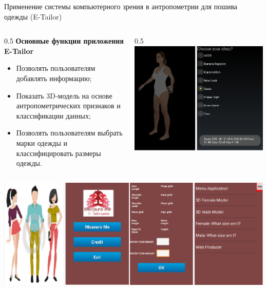 \documentclass[10pt,pdf,hyperref={unicode},xcolor=table]{beamer}
\begin{document}
\begin{frame}{Применение системы компьютерного зрения в антропометрии для пошива одежды (E-Tailor)}
\begin{columns}
		\begin{column} {0.5\textwidth}			
\textbf{Основные функции приложения E-Tailor}
\begin{itemize}
	\item Позволять пользователям добавлять информацию;
	\item Показать 3D-модель на основе антропометрических признаков и классификации данных;
	\item Позволять пользователям выбрать марки одежды и классифицировать размеры одежды.
\end{itemize}
			\end{column}
			\begin{column} {0.5\textwidth}
\includegraphics[width=1\linewidth]{p19}
			\end{column}      
		\end{columns}

\begin{center}
		\includegraphics[width=0.5\linewidth]{p20}
\end{center}

\end{frame}
\end{document}
